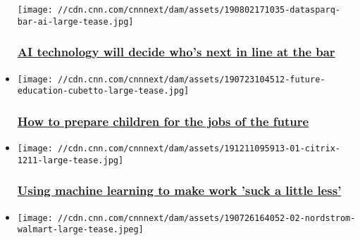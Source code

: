 \begin{itemize}
  \texttt{[image: //cdn.cnn.com/cnnnext/dam/assets/190802171035-datasparq-bar-ai-large-tease.jpg]}

  \hypertarget{ai-technology-will-decide-whos-next-in-line-at-the-bar}{%
  \subsubsection{\texorpdfstring{\href{/2019/08/02/business/bar-facial-recognition-scli-gbr-intl/index.html}{AI
  technology will decide who's next in line at the
  bar}}{AI technology will decide who's next in line at the bar}}\label{ai-technology-will-decide-whos-next-in-line-at-the-bar}}
\item
  \href{/2019/07/30/business/future-education-technology/index.html}{}

  \texttt{[image: //cdn.cnn.com/cnnnext/dam/assets/190723104512-future-education-cubetto-large-tease.jpg]}

  \hypertarget{how-to-prepare-children-for-the-jobs-of-the-future}{%
  \subsubsection{\texorpdfstring{\href{/2019/07/30/business/future-education-technology/index.html}{How
  to prepare children for the jobs of the
  future}}{How to prepare children for the jobs of the future}}\label{how-to-prepare-children-for-the-jobs-of-the-future}}
\item
  \href{/2019/12/11/business/citrix-machine-learning/index.html}{}

  \texttt{[image: //cdn.cnn.com/cnnnext/dam/assets/191211095913-01-citrix-1211-large-tease.jpg]}

  \hypertarget{using-machine-learning-to-make-work-suck-a-little-less-}{%
  \subsubsection{\texorpdfstring{\href{/2019/12/11/business/citrix-machine-learning/index.html}{Using
  machine learning to make work 'suck a little less'
  }}{Using machine learning to make work 'suck a little less' }}\label{using-machine-learning-to-make-work-suck-a-little-less-}}
\item
  \href{/2019/07/27/business/nordstrom-local-walmart-pickup-point/index.html}{}

  \texttt{[image: //cdn.cnn.com/cnnnext/dam/assets/190726164052-02-nordstrom-walmart-large-tease.jpeg]}

  \hypertarget{walmart-and-nordstrom-are-building-stores-that-dont-sell-anything}{%
}
\end{itemize}
